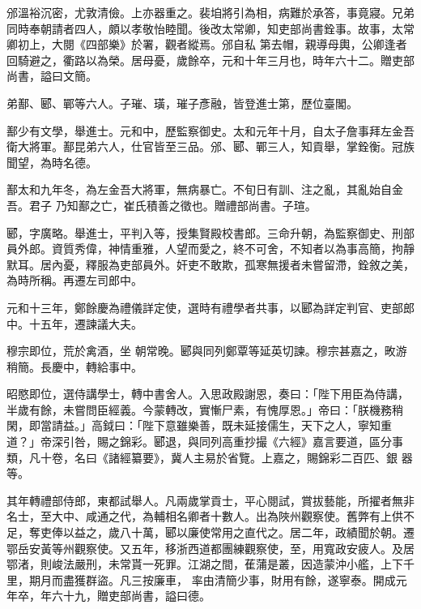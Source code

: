 \begin{pinyinscope}
 邠溫裕沉密，尤敦清儉。上亦器重之。裴垍將引為相，病難於承答，事竟寢。兄弟同時奉朝請者四人，頗以孝敬怡睦聞。後改太常卿，知吏部尚書銓事。故事，太常卿初上，大閱《四部樂》於署，觀者縱焉。邠自私
 第去帽，親導母輿，公卿逢者回騎避之，衢路以為榮。居母憂，歲餘卒，元和十年三月也，時年六十二。贈吏部尚書，謚曰文簡。



 弟鄯、郾、鄲等六人。子璀、璜，璀子彥融，皆登進士第，歷位臺閣。



 鄯少有文學，舉進士。元和中，歷監察御史。太和元年十月，自太子詹事拜左金吾衛大將軍。鄯昆弟六人，仕官皆至三品。邠、郾、鄲三人，知貢舉，掌銓衡。冠族聞望，為時名德。



 鄯太和九年冬，為左金吾大將軍，無病暴亡。不旬日有訓、注之亂，其亂始自金吾。君子
 乃知鄯之亡，崔氏積善之徵也。贈禮部尚書。子瑄。



 郾，字廣略。舉進士，平判入等，授集賢殿校書郎。三命升朝，為監察御史、刑部員外郎。資質秀偉，神情重雅，人望而愛之，終不可舍，不知者以為事高簡，拘靜默耳。居內憂，釋服為吏部員外。奸吏不敢欺，孤寒無援者未嘗留滯，銓敘之美，為時所稱。再遷左司郎中。



 元和十三年，鄭餘慶為禮儀詳定使，選時有禮學者共事，以郾為詳定判官、吏部郎中。十五年，遷諫議大夫。



 穆宗即位，荒於禽酒，坐
 朝常晚。郾與同列鄭覃等延英切諫。穆宗甚嘉之，畋游稍簡。長慶中，轉給事中。



 昭愍即位，選侍講學士，轉中書舍人。入思政殿謝恩，奏曰：「陛下用臣為侍講，半歲有餘，未嘗問臣經義。今蒙轉改，實慚尸素，有愧厚恩。」帝曰：「朕機務稍閑，即當請益。」高鉞曰：「陛下意雖樂善，既未延接儒生，天下之人，寧知重道？」帝深引咎，賜之錦彩。郾退，與同列高重抄撮《六經》嘉言要道，區分事類，凡十卷，名曰《諸經纂要》，冀人主易於省覽。上嘉之，賜錦彩二百匹、銀
 器等。



 其年轉禮部侍郎，東都試舉人。凡兩歲掌貢士，平心閱試，賞拔藝能，所擢者無非名士，至大中、咸通之代，為輔相名卿者十數人。出為陜州觀察使。舊弊有上供不足，奪吏俸以益之，歲八十萬，郾以廉使常用之直代之。居二年，政績聞於朝。遷鄂岳安黃等州觀察使。又五年，移浙西道都團練觀察使，至，用寬政安疲人。及居鄂渚，則峻法嚴刑，未常貰一死罪。江湖之間，萑蒲是叢，因造蒙沖小艦，上下千里，期月而盡獲群盜。凡三按廉車，
 率由清簡少事，財用有餘，遂寧泰。開成元年卒，年六十九，贈吏部尚書，謚曰德。




\end{pinyinscope}
